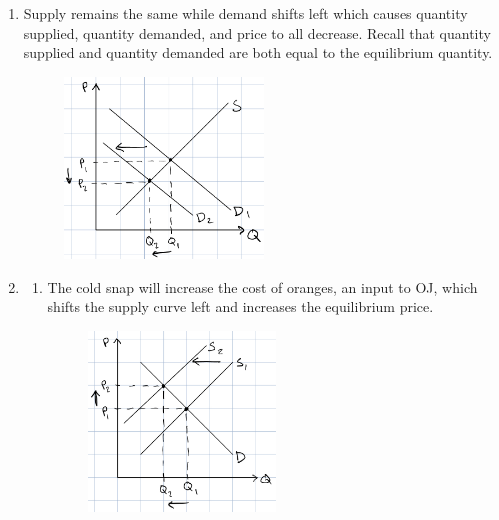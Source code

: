 \documentclass{article}
\begin{document}
\begin{enumerate}
\item Supply remains the same while demand shifts left which causes quantity supplied, quantity demanded, and price to all decrease. Recall that quantity supplied and quantity demanded are both equal to the equilibrium quantity. 
	\begin{figure}[h]
	\centering
	\includegraphics[width = 0.5\textwidth]{problem4}
	\end{figure}
	
\newpage

\item
	\begin{enumerate}
	
	\item The cold snap will increase the cost of oranges, an input to OJ, which shifts the supply curve left and increases the equilibrium price. 
	\begin{figure}[h]
	\centering
	\includegraphics[width = 0.5\textwidth]{problem5a}
	\end{figure}


\end{enumerate}
\end{enumerate}
\end{document}
